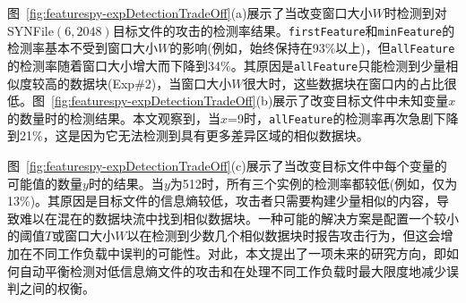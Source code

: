 图~\ref{fig:featurespy-expDetectionTradeOff}(a)展示了当改变窗口大小$W$时检测到对SYNFile$(6,2048)$目标文件的攻击的检测率结果。{\tt firstFeature}和{\tt minFeature}的检测率基本不受到窗口大小$W$的影响(例如，始终保持在93\%以上)，但{\tt allFeature}的检测率随着窗口大小增大而下降到34\%。其原因是{\tt allFeature}只能检测到少量相似度较高的数据块(Exp\#2)，当窗口大小$W$很大时，这些数据块在窗口内的占比很低。图~\ref{fig:featurespy-expDetectionTradeOff}(b)展示了改变目标文件中未知变量$x$的数量时的检测结果。本文观察到，当$x$=9时，{\tt allFeature}的检测率再次急剧下降到21\%，这是因为它无法检测到具有更多差异区域的相似数据块。

图~\ref{fig:featurespy-expDetectionTradeOff}(c)展示了当改变目标文件中每个变量的可能值的数量$y$时的结果。当$y$为512时，所有三个实例的检测率都较低(例如，仅为13\%)。其原因是目标文件的信息熵较低，攻击者只需要构建少量相似的内容，导致\sysnameF 难以在混在的数据块流中找到相似数据块。一种可能的解决方案是配置一个较小的阈值$T$或窗口大小$W$以在检测到少数几个相似数据块时报告攻击行为，但这会增加在不同工作负载中误判的可能性。对此，本文提出了一项未来的研究方向，即如何自动平衡检测对低信息熵文件的攻击和在处理不同工作负载时最大限度地减少误判之间的权衡。